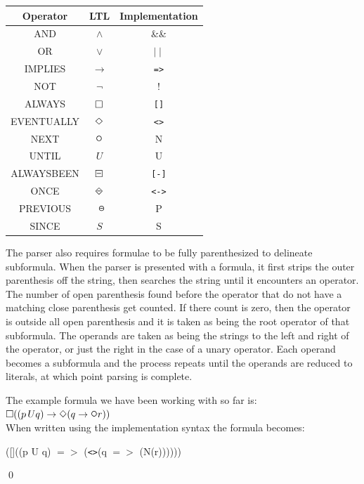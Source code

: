 \begin{center}
\begin{tabular}{c|c|c} 
Operator  & LTL & Implementation\\
\hline
AND & $ \land $ & \&\& \\
OR & $ \lor $ & $ \mid \mid $ \\
IMPLIES & $ \rightarrow $ & \texttt{=>} \\
NOT & $ \neg $ & ! \\
ALWAYS & $ \square $ & \texttt{[]} \\
EVENTUALLY & $ \Diamond $ & \texttt{<>} \\
NEXT & $ \LTLnext $ & N \\
UNTIL & $ U $ & U \\
ALWAYSBEEN & $ \LTLalwaysbeen $ & \texttt{[-]} \\
ONCE & $ \LTLonce $ & \texttt{<->} \\
PREVIOUS & $ \LTLprevious $ & P \\
SINCE & $ S $ & S \\
\hline
\end{tabular}
\end{center}

The parser also requires formulae to be fully parenthesized to delineate subformula.  When the parser is presented with a formula, it first strips the outer parenthesis off the string, then searches the string until it encounters an operator.  The number of open parenthesis found before the operator that do not have a matching close parenthesis get counted.  If there count is zero, then the operator is outside all open parenthesis and it is taken as being the root operator of that subformula.  The operands are taken as being the strings to the left and right of the operator, or just the right in the case of a unary operator.  Each operand becomes a subformula and the process repeats until the operands are reduced to literals, at which point parsing is complete.

\begin{myEx} The example formula we have been working with so far is:\\

$ \LTLalways((p \,U q) \rightarrow \LTLeventually(q \rightarrow \LTLnext r)) $\\

When written using the implementation syntax the formula becomes:

([]((p U q) $=>$ (\texttt{<>}(q $=>$ (N(r))))))

\qed
\end{myEx}

